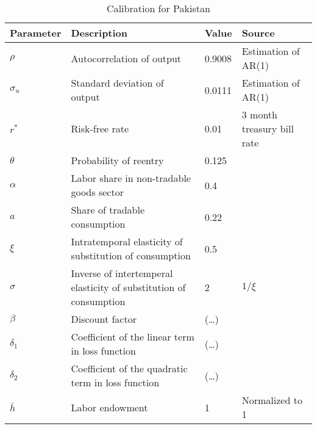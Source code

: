 \begin{table}[h]
    \centering
    \begin{tabular}{@{}llll@{}}
        \toprule
    Parameter  & Description                                                       & Value  & Source                                                                         \\ \midrule
    $\rho$     & Autocorrelation of output                                         & 0.9008  & Estimation of AR(1)\\
    $\sigma_u$ & Standard deviation of output                                      & 0.0111 & Estimation of AR(1) \\
    $r^*$      & Risk-free rate                                                    & 0.01 & 3 month treasury bill rate \\
    $\theta$   & Probability of reentry                                            & 0.125 & \citet*{Reinhart-Rogoff-2014-100-episode}                                              \\
    $\alpha$   & Labor share in non-tradable goods sector                          & 0.4   & \citet{Jegajeevan-Sri-Lanka-DSGE}                                                       \\
    $a$        & Share of tradable consumption                                     & 0.22   &\citet*{Jegajeevan-Sri-Lanka-DSGE}                    \\
    $\xi$      & Intratemporal elasticity of substitution of consumption & 0.5   & \citet*{Jegajeevan-Sri-Lanka-DSGE}                              \\
    $\sigma$   & Inverse of intertemperal elasticity of substitution of consumption  & 2   & $1 / \xi$                                                                      \\
    $\beta$    & Discount factor                                                   & (\dots)  &                                                                                \\
    $\delta_1$ & Coefficient of the linear term in loss function                   &  (\dots) &                                                                                \\
    $\delta_2$ & Coefficient of the quadratic term in loss function                &  (\dots)   &                                                                                \\
    $\bar{h}$  & Labor endowment                                                   & 1      & Normalized to 1\\
    \bottomrule
    \end{tabular}%
    \caption{Calibration for Pakistan}
    \label{tab:cal-pakistan}
    \end{table}